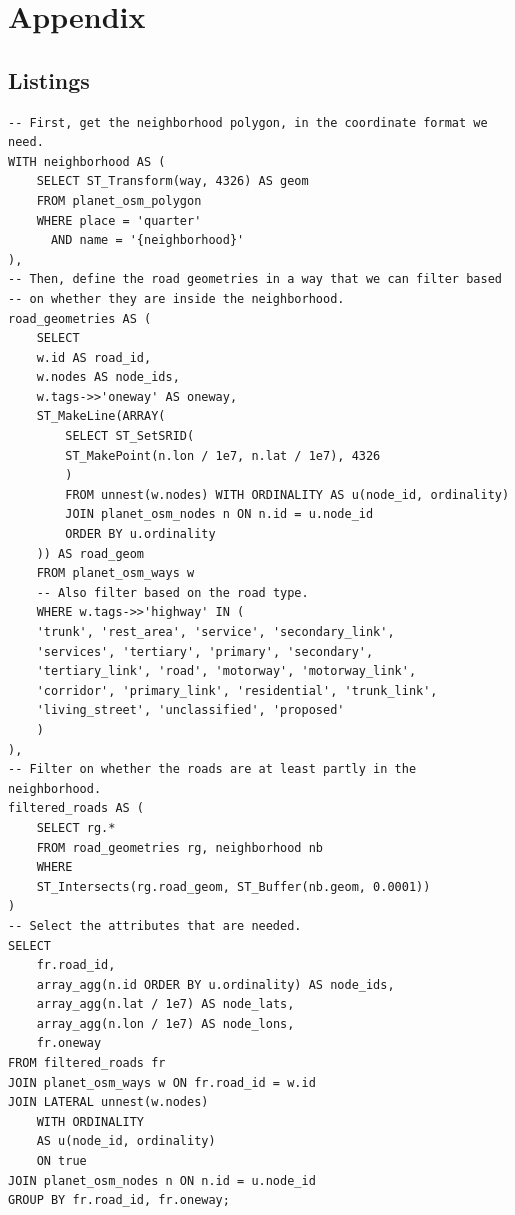 \documentclass[12pt]{article}
\numberwithin{equation}{section}
\newcommand{\1}[1]{\,I_{#1}} %
\begin{document}
\section{Appendix}
\subsection{Listings}
\begin{lstlisting}[caption={The query to extract roads inside a neighborhood.}, label={lst:sql-roads}]
-- First, get the neighborhood polygon, in the coordinate format we need.
WITH neighborhood AS (
    SELECT ST_Transform(way, 4326) AS geom
    FROM planet_osm_polygon
    WHERE place = 'quarter'
      AND name = '{neighborhood}'
),
-- Then, define the road geometries in a way that we can filter based 
-- on whether they are inside the neighborhood.
road_geometries AS (
    SELECT
	w.id AS road_id,
	w.nodes AS node_ids,
	w.tags->>'oneway' AS oneway,
	ST_MakeLine(ARRAY(
	    SELECT ST_SetSRID(
		ST_MakePoint(n.lon / 1e7, n.lat / 1e7), 4326
		)
	    FROM unnest(w.nodes) WITH ORDINALITY AS u(node_id, ordinality)
	    JOIN planet_osm_nodes n ON n.id = u.node_id
	    ORDER BY u.ordinality
	)) AS road_geom
    FROM planet_osm_ways w
    -- Also filter based on the road type.
    WHERE w.tags->>'highway' IN (
	'trunk', 'rest_area', 'service', 'secondary_link',
	'services', 'tertiary', 'primary', 'secondary',
	'tertiary_link', 'road', 'motorway', 'motorway_link', 
	'corridor', 'primary_link', 'residential', 'trunk_link', 
	'living_street', 'unclassified', 'proposed'
    )
),
-- Filter on whether the roads are at least partly in the neighborhood.
filtered_roads AS (
    SELECT rg.*
    FROM road_geometries rg, neighborhood nb
    WHERE
	ST_Intersects(rg.road_geom, ST_Buffer(nb.geom, 0.0001))
)
-- Select the attributes that are needed.
SELECT
    fr.road_id,
    array_agg(n.id ORDER BY u.ordinality) AS node_ids,
    array_agg(n.lat / 1e7) AS node_lats,
    array_agg(n.lon / 1e7) AS node_lons,
    fr.oneway
FROM filtered_roads fr
JOIN planet_osm_ways w ON fr.road_id = w.id
JOIN LATERAL unnest(w.nodes) 
    WITH ORDINALITY 
    AS u(node_id, ordinality) 
    ON true
JOIN planet_osm_nodes n ON n.id = u.node_id
GROUP BY fr.road_id, fr.oneway;
\end{lstlisting}
\end{document}
